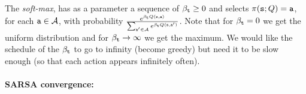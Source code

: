 The {\em soft-max}, has as a parameter a sequence of
$\beta_{\tt t}\geq 0$ and selects $\pi({\tt s};Q)={\tt a}$, for
each ${\tt a} \in \mathcal{A}$, with probability $\frac{e^{\beta_{\tt t}
Q({\tt s},{\tt a})}}{\sum_{{\tt a}'\in \mathcal{A}}e^{\beta_{\tt t}
Q({\tt s},{\tt a}')}}$. Note that for $\beta_{\tt t}=0$ we get the
uniform distribution and for $\beta_{\tt t}\rightarrow \infty$ we get
the maximum. We would like the schedule of the $\beta_{\tt t}$ to go
to infinity (become greedy) but need it to be slow enough (so that
each action appears infinitely often).

\begin{advanced}
\paragraph{SARSA convergence:}


\end{advanced}

